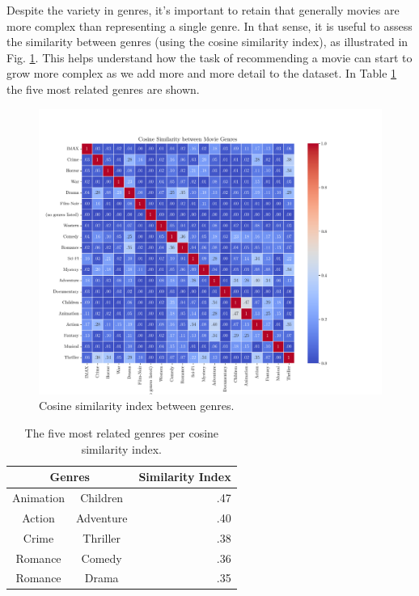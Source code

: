 \documentclass[conference]{IEEEtran}
\begin{document}
Despite the variety in genres, it's important to retain that generally movies are more complex than representing a single genre. In that sense, it is useful to assess the similarity between genres (using the cosine similarity index), as illustrated in Fig. \ref{fig:genre_similarity}. This helps understand how the task of recommending a movie can start to grow more complex as we add more and more detail to the dataset. In Table \ref{tab:genre_similarity} the five most related genres are shown.

\begin{figure}[H]
    \centering
    \includegraphics[width=1\linewidth]{assets/genre_similarity.png}
    \caption{Cosine similarity index between genres.}
    \label{fig:genre_similarity}
\end{figure}

\begin{table}[H]
\centering
\caption{The five most related genres per cosine similarity index.}
\label{tab:genre_similarity}
\begin{tabular}{ccr}
\toprule
\multicolumn{2}{c}{\textbf{Genres}} & \textbf{Similarity Index} \\
\midrule
Animation & Children & .47 \\ 
Action & Adventure & .40 \\
Crime & Thriller & .38 \\
Romance & Comedy & .36 \\
Romance & Drama & .35 \\
\bottomrule
\end{tabular}
\end{table} 
\end{document}
